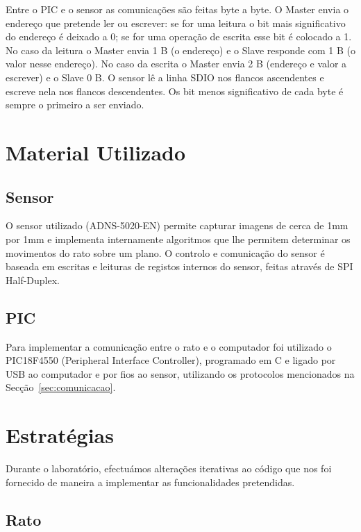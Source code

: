\documentclass[a4paper]{article}
\begin{document}
Entre o PIC e o sensor as comunicações são feitas byte a byte. O Master envia o endereço que pretende ler ou escrever: se for uma leitura o bit mais significativo do endereço é deixado a 0; se for uma operação de escrita esse bit é colocado a 1. No caso da leitura o Master envia 1 B (o endereço) e o Slave responde com 1 B (o valor nesse endereço). No caso da escrita o Master envia 2 B (endereço e valor a escrever) e o Slave 0 B. O sensor lê a linha SDIO nos flancos ascendentes e escreve nela nos flancos descendentes. Os bit menos significativo de cada byte é sempre o primeiro a ser enviado.

\section{Material Utilizado}
 \subsection{Sensor}
O sensor utilizado (ADNS-5020-EN) permite capturar imagens de cerca de 1mm por 1mm e implementa internamente algoritmos que lhe permitem determinar os movimentos do rato sobre um plano. O controlo e comunicação do sensor é baseada em escritas e leituras de registos internos do sensor, feitas através de SPI Half-Duplex.

\subsection{PIC}
Para implementar a comunicação entre o rato e o computador foi utilizado o PIC18F4550 (Peripheral Interface Controller), programado em C e ligado por USB ao computador e por fios ao sensor, utilizando os protocolos mencionados na Secção~\ref{sec:comunicacao}.

\section{Estratégias}
Durante o laboratório, efectuámos alterações iterativas ao código que nos foi fornecido de maneira a implementar as funcionalidades pretendidas.

\subsection{Rato}
\end{document}
